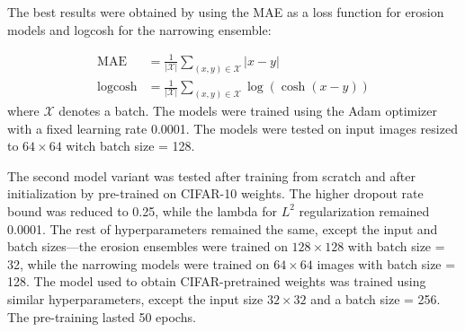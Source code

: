 \documentclass[thesis=B,english]{FITthesis}[2019/12/23]
\begin{document}
The best results were obtained by using the MAE as a loss function for erosion models and logcosh for the narrowing ensemble:

\begin{align}
\text{MAE}     &= \frac{1}{|\mathcal{X}|} \sum_{(x, y) \in \mathcal{X} } | x - y | \nonumber \\
\text{logcosh} &= \frac{1}{|\mathcal{X}|} \sum_{(x, y) \in \mathcal{X} } \log(\cosh(x - y)) \nonumber
\end{align}
where $\mathcal{X}$ denotes a batch. The models were trained using the Adam optimizer with a fixed learning rate 0.0001. The models were tested on input images resized to $64 \times 64$ witch batch size = 128.

The second model variant was tested after training from scratch and after initialization by pre-trained on CIFAR-10 weights. The higher dropout rate bound was reduced to 0.25, while the lambda for $L^2$ regularization remained 0.0001. The rest of hyperparameters remained the same, except the input and batch sizes---the erosion ensembles were trained on $128 \times 128$ with batch size = 32, while the narrowing models were trained on $64 \times 64$ images with batch size = 128. The model used to obtain CIFAR-pretrained weights was trained using similar hyperparameters, except the input size $32 \times 32$ and a batch size = 256. The pre-training lasted 50 epochs.
\end{document}
